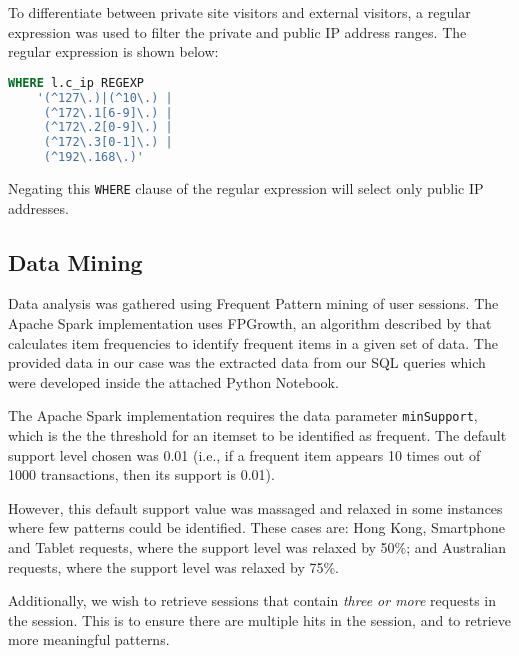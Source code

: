 To differentiate between private site visitors and external visitors, a regular expression was used to filter the private and public IP address ranges. The regular expression is shown below:

\begin{lstlisting}[language=SQL, xleftmargin=2cm]
WHERE l.c_ip REGEXP 
	'(^127\.)|(^10\.) | 
	 (^172\.1[6-9]\.) |
	 (^172\.2[0-9]\.) |
	 (^172\.3[0-1]\.) |
	 (^192\.168\.)'
\end{lstlisting}

Negating this \texttt{WHERE} clause of the regular expression will select only public IP addresses.

\subsection{Data Mining}

Data analysis was gathered using Frequent Pattern mining of user sessions. The Apache Spark implementation \citep{spark} uses FPGrowth, an algorithm described by \citet{Han:2000:MFP:335191.335372} that calculates item frequencies to identify frequent items in a given set of data. The provided data in our case was the extracted data from our SQL queries which were developed inside the attached Python Notebook.

The Apache Spark implementation requires the data parameter \texttt{minSupport}, which is the the threshold for an itemset to be identified as frequent. The default support level chosen was 0.01 (i.e., if a frequent item appears 10 times out of 1000 transactions, then its support is 0.01).

However, this default support value was massaged and relaxed in some instances where few patterns could be identified. These cases are: Hong Kong, Smartphone and Tablet requests, where the support level was relaxed by 50\%; and Australian requests, where the support level was relaxed by 75\%.

Additionally, we wish to retrieve sessions that contain \textit{three or more} requests in the session. This is to ensure there are multiple hits in the session, and to retrieve more meaningful patterns.